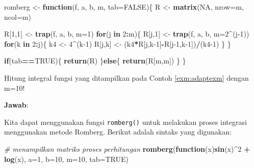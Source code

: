 \documentclass[]{book}
\newenvironment{Shaded}{\begin{snugshade}}{\end{snugshade}}
\newcommand{\CommentTok}[1]{\textcolor[rgb]{0.56,0.35,0.01}{\textit{#1}}}
\newcommand{\ControlFlowTok}[1]{\textcolor[rgb]{0.13,0.29,0.53}{\textbf{#1}}}
\newcommand{\DataTypeTok}[1]{\textcolor[rgb]{0.13,0.29,0.53}{#1}}
\newcommand{\DecValTok}[1]{\textcolor[rgb]{0.00,0.00,0.81}{#1}}
\newcommand{\KeywordTok}[1]{\textcolor[rgb]{0.13,0.29,0.53}{\textbf{#1}}}
\newcommand{\NormalTok}[1]{#1}
\newcommand{\OperatorTok}[1]{\textcolor[rgb]{0.81,0.36,0.00}{\textbf{#1}}}
\newcommand{\OtherTok}[1]{\textcolor[rgb]{0.56,0.35,0.01}{#1}}
\newcommand{\StringTok}[1]{\textcolor[rgb]{0.31,0.60,0.02}{#1}}
\theoremstyle{definition}
\theoremstyle{definition}
\theoremstyle{definition}
\theoremstyle{remark}
\let\BeginKnitrBlock\begin \let\EndKnitrBlock\end
\begin{document}
\begin{Shaded}
\begin{Highlighting}[]
\NormalTok{romberg <-}\StringTok{ }\ControlFlowTok{function}\NormalTok{(f, a, b, m, }\DataTypeTok{tab=}\OtherTok{FALSE}\NormalTok{)\{}
\NormalTok{  R <-}\StringTok{ }\KeywordTok{matrix}\NormalTok{(}\OtherTok{NA}\NormalTok{, }\DataTypeTok{nrow=}\NormalTok{m, }\DataTypeTok{ncol=}\NormalTok{m)}
  
\NormalTok{  R[}\DecValTok{1}\NormalTok{,}\DecValTok{1}\NormalTok{] <-}\StringTok{ }\KeywordTok{trap}\NormalTok{(f, a, b, }\DataTypeTok{m=}\DecValTok{1}\NormalTok{)}
  \ControlFlowTok{for}\NormalTok{(j }\ControlFlowTok{in} \DecValTok{2}\OperatorTok{:}\NormalTok{m)\{}
\NormalTok{    R[j,}\DecValTok{1}\NormalTok{] <-}\StringTok{ }\KeywordTok{trap}\NormalTok{(f, a, b, }\DataTypeTok{m=}\DecValTok{2}\OperatorTok{^}\NormalTok{(j}\DecValTok{-1}\NormalTok{))}
    \ControlFlowTok{for}\NormalTok{(k }\ControlFlowTok{in} \DecValTok{2}\OperatorTok{:}\NormalTok{j)\{}
\NormalTok{      k4 <-}\StringTok{ }\DecValTok{4}\OperatorTok{^}\NormalTok{(k}\DecValTok{-1}\NormalTok{)}
\NormalTok{      R[j,k] <-}\StringTok{ }\NormalTok{(k4}\OperatorTok{*}\NormalTok{R[j,k}\DecValTok{-1}\NormalTok{]}\OperatorTok{-}\NormalTok{R[j}\DecValTok{-1}\NormalTok{,k}\DecValTok{-1}\NormalTok{])}\OperatorTok{/}\NormalTok{(k4}\DecValTok{-1}\NormalTok{)}
\NormalTok{    \}}
\NormalTok{  \}}
  
  \ControlFlowTok{if}\NormalTok{(tab}\OperatorTok{==}\OtherTok{TRUE}\NormalTok{)\{}
    \KeywordTok{return}\NormalTok{(R)}
\NormalTok{  \}}\ControlFlowTok{else}\NormalTok{\{}
    \KeywordTok{return}\NormalTok{(R[m,m])}
\NormalTok{  \}}
\NormalTok{\}}
\end{Highlighting}
\end{Shaded}

\BeginKnitrBlock{example}
\protect\hypertarget{exm:rombergexm}{}{\label{exm:rombergexm} }Hitung integral fungsi yang ditampilkan pada Contoh \ref{exm:adaptexm} dengan m=10!
\EndKnitrBlock{example}

\textbf{Jawab}:

Kita dapat menggunakan fungsi \texttt{romberg()} untuk melakukan proses integrasi menggunakan metode Romberg. Berikut adalah sintaks yang digunakan:

\begin{Shaded}
\begin{Highlighting}[]
\CommentTok{# menampilkan matriks proses perhitungan}
\KeywordTok{romberg}\NormalTok{(}\ControlFlowTok{function}\NormalTok{(x)}\KeywordTok{sin}\NormalTok{(x)}\OperatorTok{^}\DecValTok{2} \OperatorTok{+}\StringTok{ }\KeywordTok{log}\NormalTok{(x),}
        \DataTypeTok{a=}\DecValTok{1}\NormalTok{, }\DataTypeTok{b=}\DecValTok{10}\NormalTok{, }\DataTypeTok{m=}\DecValTok{10}\NormalTok{, }\DataTypeTok{tab=}\OtherTok{TRUE}\NormalTok{)}
\end{Highlighting}
\end{Shaded}
\end{document}
